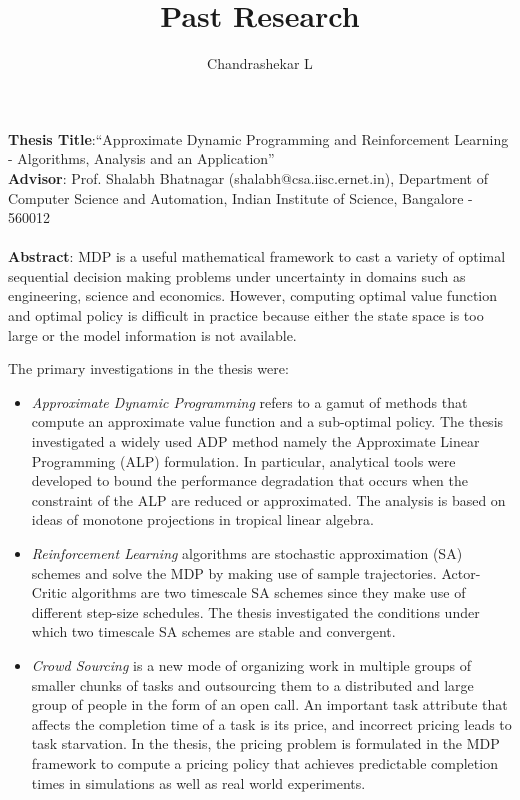 \documentclass[onecolumn,12pt]{IEEEtran}
\title{\Large Past Research}
\author{Chandrashekar L}
\date{}
\begin{document}
\maketitle
\textbf{Thesis Title}:``Approximate Dynamic Programming and Reinforcement Learning - Algorithms, Analysis and an Application''\\
\textbf{Advisor}: Prof. Shalabh Bhatnagar (shalabh@csa.iisc.ernet.in), Department of Computer Science and Automation, Indian Institute of Science, Bangalore - 560012\\
\\
\textbf{Abstract}: MDP is a useful mathematical framework to cast a variety of optimal sequential decision making problems under uncertainty in domains such as engineering, science and economics. However, computing optimal value function and optimal policy is difficult in practice because either the state space is too large or the model information is not available.\par
The primary investigations in the thesis were:
\begin{itemize}
\item \emph{Approximate Dynamic Programming} refers to a gamut of methods that compute an approximate value function and a sub-optimal policy. The thesis investigated a widely used ADP method namely the Approximate Linear Programming (ALP) formulation. In particular, analytical tools were developed to bound the performance degradation that occurs when the constraint of the ALP are reduced or approximated. The analysis is based on ideas of monotone projections in tropical linear algebra.
\item \emph{Reinforcement Learning} algorithms are stochastic approximation (SA) schemes and solve the MDP by making use of sample trajectories. Actor-Critic algorithms are two timescale SA schemes since they make use of different step-size schedules. The thesis investigated the conditions under which two timescale SA schemes are stable and convergent.
\item \emph{Crowd Sourcing} is a new mode of organizing work in multiple groups of smaller chunks of tasks and outsourcing them to a distributed and large group of people in the form of an open call. An important task attribute that affects the completion time of a task is its price, and incorrect pricing leads to task starvation. In the thesis, the pricing problem is formulated in the MDP framework to compute a pricing policy that achieves predictable completion times in simulations as well as real world experiments.
\end{itemize}
\end{document}
